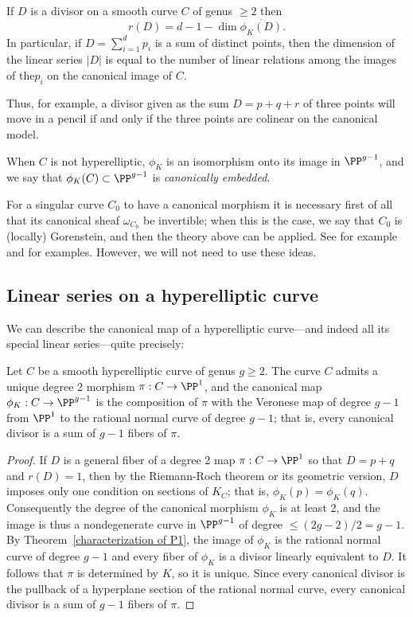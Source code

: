 \begin{corollary}\label{geometric RR}
If $D$ is a divisor on a smooth curve $C$ of genus $\geq 2$ then
$$
r(D) = d - 1 - \dim \overline{ \phi_K(D)}.
$$
In particular, if $D = \sum_{i=1}^dp_i$ is a sum of distinct points, then
 the dimension of the linear series $|D|$  is equal to the number of linear relations among the images of the$p_i$ on the canonical 
 image of $C$.
\end{corollary}

Thus, for example, a divisor given as the sum $D = p+q+r$ of three points will move in a pencil if and only if the three points are colinear on the canonical model.

When $C$ is not hyperelliptic, $\phi_K$ is an isomorphism onto its image in $\PP^{g-1}$, and we say that $ \phi_K(C)\subset \PP^{g-1}$ is \emph{canonically embedded}. 

\begin{remark}
For a singular curve $C_0$ to have a canonical morphism it is necessary first of all that its canonical sheaf
 $\omega_{C_0}$ be invertible; when this is the case, we say that $C_0$ is (locally) Gorenstein, and then
the theory above can be applied. See for example \cite{graphcurves} and \cite{ribbons} for examples. 
However, we will not need to use these ideas.
\end{remark}

\subsection{Linear series on a hyperelliptic curve}
We can describe the canonical map of a hyperelliptic curve---and indeed all its special linear series---quite precisely:

\begin{corollary}\label{canonical on hyperelliptic}
Let $C$ be a smooth hyperelliptic curve of genus $g\geq 2$. The curve $C$ admits a unique degree 2 morphism $\pi: C\to \PP^1$,
and the canonical map $\phi_K: C\to \PP^{g-1}$ is the composition of $\pi$ with the Veronese map of degree $g-1$ from
$\PP^1$ to the rational normal curve of degree $g-1$; that is, every canonical divisor is a sum of $g-1$ fibers of $\pi$.
\end{corollary}

\begin{proof}
If $D$ is a general fiber of a degree 2 map $\pi:C\to \PP^1$ so that $D= p+q$ and $r(D) = 1$, then by the Riemann-Roch theorem or its geometric version, $D$ imposes only one condition on sections of $K_C$; that is, $\phi_K(p) = \phi_K(q)$. Consequently the degree of the canonical morphism $\phi_K$ is at least 2, and the image is thus a nondegenerate curve in $\PP^{g-1}$ of degree $\leq (2g-2)/2 = g-1$. By Theorem~\ref{characterization of P1}, the image of $\phi_K$ is the rational normal curve of degree $g-1$ and every fiber of $\phi_K$ is a divisor linearly equivalent to $D$. It follows that $\pi$ is determined by $K$, so it is unique. Since every canonical divisor is the pullback of a hyperplane section of the rational normal curve,
every canonical divisor is a sum of $g-1$ fibers of $\pi$.
\end{proof}

